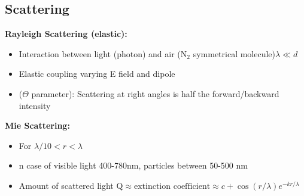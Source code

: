 \subsection{Scattering}
 \textbf{Rayleigh Scattering (elastic):}
 \begin{itemize}
    \item Interaction between light (photon) and air (\(\text{N}_2\) symmetrical molecule)\(\lambda \ll d\)
    \item Elastic coupling varying E field and dipole
    \item (\(\Theta\) parameter): Scattering at right angles is half the forward/backward intensity
 \end{itemize}
 \textbf{Mie Scattering:}
 \begin{itemize}
    \item For \(\lambda/10 < r < \lambda\)
    \item n case of visible light 400-780nm, particles between 50-500 nm
    \item Amount of scattered light \(\text{Q} \approx \text{extinction coefficient}\approx c+\cos(r/\lambda)e^{-kr/\lambda}\)
 \end{itemize}